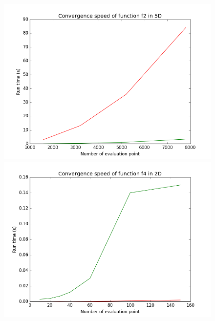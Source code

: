 \begin{figure}[h]  \ContinuedFloat
	 \begin{minipage}[b]{0.32\linewidth}
      \centering \includegraphics[scale=0.3]{images/f2_5d_s.png}
   \end{minipage}
		\begin{minipage}[b]{0.32\linewidth}
				\centering \includegraphics[scale=0.3]{images/f4_2d_s.png}
		\end{minipage}
		\begin{minipage}[b]{0.32\linewidth}

\end{minipage}
\end{figure}
